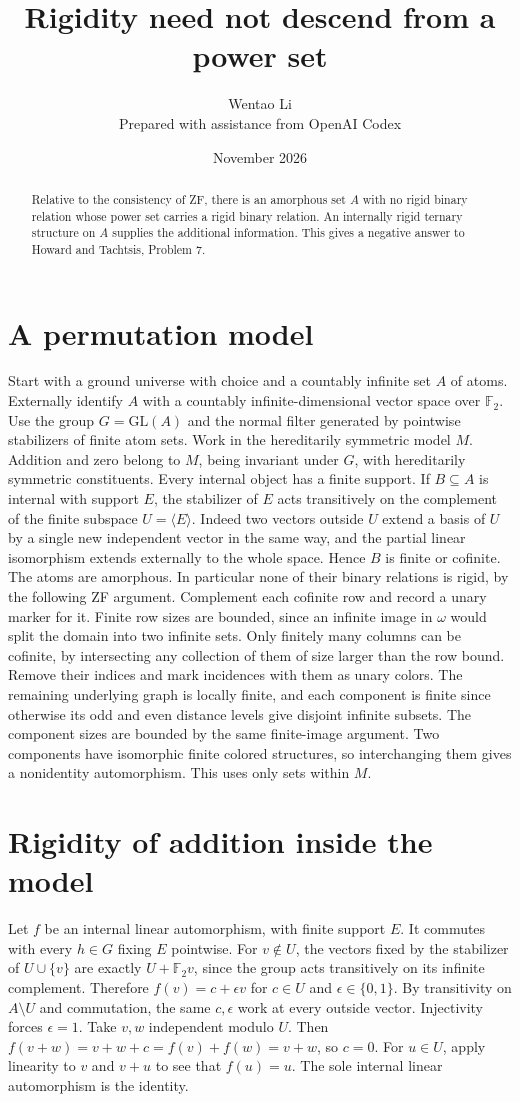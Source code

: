 \documentclass[11pt]{article}
\title{Rigidity need not descend from a power set}
\author{Wentao Li\\[2pt]\small Prepared with assistance from OpenAI Codex}
\date{November 2026}
\begin{document}
\maketitle
\begin{abstract}
Relative to the consistency of ZF, there is an amorphous set $A$ with no rigid binary relation whose power set carries a rigid binary relation. An internally rigid ternary structure on $A$ supplies the additional information. This gives a negative answer to Howard and Tachtsis, Problem 7.
\end{abstract}
\section{A permutation model}
Start with a ground universe with choice and a countably infinite set $A$ of atoms. Externally identify $A$ with a countably infinite-dimensional vector space over $\mathbb F_2$. Use the group $G=\mathrm{GL}(A)$ and the normal filter generated by pointwise stabilizers of finite atom sets. Work in the hereditarily symmetric model $M$. Addition and zero belong to $M$, being invariant under $G$, with hereditarily symmetric constituents. Every internal object has a finite support.
If $B\subseteq A$ is internal with support $E$, the stabilizer of $E$ acts transitively on the complement of the finite subspace $U=\langle E\rangle$. Indeed two vectors outside $U$ extend a basis of $U$ by a single new independent vector in the same way, and the partial linear isomorphism extends externally to the whole space. Hence $B$ is finite or cofinite. The atoms are amorphous. In particular none of their binary relations is rigid, by the following ZF argument. Complement each cofinite row and record a unary marker for it. Finite row sizes are bounded, since an infinite image in $\omega$ would split the domain into two infinite sets. Only finitely many columns can be cofinite, by intersecting any collection of them of size larger than the row bound. Remove their indices and mark incidences with them as unary colors. The remaining underlying graph is locally finite, and each component is finite since otherwise its odd and even distance levels give disjoint infinite subsets. The component sizes are bounded by the same finite-image argument. Two components have isomorphic finite colored structures, so interchanging them gives a nonidentity automorphism. This uses only sets within $M$.
\section{Rigidity of addition inside the model}
Let $f$ be an internal linear automorphism, with finite support $E$. It commutes with every $h\in G$ fixing $E$ pointwise. For $v\notin U$, the vectors fixed by the stabilizer of $U\cup\{v\}$ are exactly $U+\mathbb F_2v$, since the group acts transitively on its infinite complement. Therefore $f(v)=c+\epsilon v$ for $c\in U$ and $\epsilon\in\{0,1\}$. By transitivity on $A\setminus U$ and commutation, the same $c,\epsilon$ work at every outside vector. Injectivity forces $\epsilon=1$. Take $v,w$ independent modulo $U$. Then $f(v+w)=v+w+c=f(v)+f(w)=v+w$, so $c=0$. For $u\in U$, apply linearity to $v$ and $v+u$ to see that $f(u)=u$. The sole internal linear automorphism is the identity.
\end{document}
